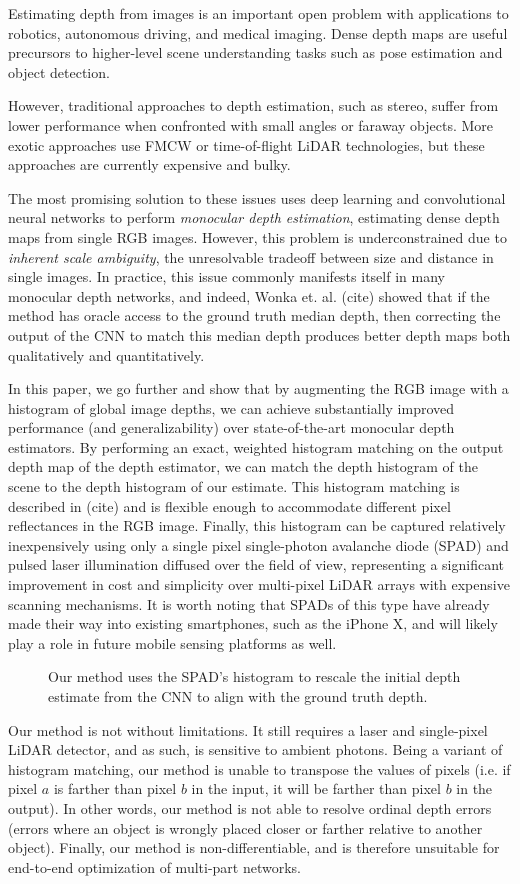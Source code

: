 Estimating depth from images is an important open problem with applications
to robotics, autonomous driving, and medical imaging. Dense depth maps are
useful precursors to higher-level scene understanding tasks such as pose
estimation and object detection.

However, traditional approaches to depth estimation, such as stereo, suffer from lower performance
when confronted with small angles or faraway objects.
More exotic approaches use FMCW or time-of-flight LiDAR technologies,
but these approaches are currently expensive and bulky. 

The most promising solution to these issues uses deep learning and 
convolutional neural networks to perform \textit{monocular depth estimation},
estimating dense depth maps from single RGB images. 
However, this problem is underconstrained due to \textit{inherent scale ambiguity}, the unresolvable
tradeoff between size and distance in single images. In practice, this issue commonly
manifests itself in many monocular depth networks, and indeed, 
Wonka et. al. (cite) showed that if the method has oracle access to the ground truth
median depth, then correcting the output of the CNN to match this median
depth produces better depth maps both qualitatively and quantitatively.

In this paper, we go further and show that by augmenting the RGB image with a histogram of
global image depths, we can achieve substantially improved performance
(and generalizability) over state-of-the-art monocular depth
estimators. By performing an exact, weighted histogram matching on the output
depth map of the depth estimator, we can match the depth histogram of the scene
to the depth histogram of our estimate. This histogram matching is described in
(cite) and is flexible enough to accommodate different pixel reflectances in the
RGB image. Finally, this histogram can be captured
relatively inexpensively using only a single pixel single-photon avalanche diode
(SPAD) and pulsed laser illumination diffused over the field of view, 
representing a significant improvement in cost and simplicity over multi-pixel LiDAR
arrays with expensive scanning mechanisms. It is
worth noting that SPADs of this type have already made their way into existing
smartphones, such as the iPhone X, and will likely play a role in future mobile sensing platforms as well.

\begin{figure}
  \caption{Our method uses the SPAD's histogram to rescale the initial depth
    estimate from the CNN to align with the ground truth depth.}
\end{figure}
Our method is not without limitations. It still requires a laser and
single-pixel LiDAR detector, and as such, is sensitive to ambient photons. Being 
a variant of histogram matching, our method is unable to transpose the
values of pixels (i.e. if pixel $a$ is farther
than pixel $b$ in the input, it will be farther than pixel $b$ in the output).
In other words, our method is not able to resolve ordinal depth errors
(errors where an object is wrongly placed closer or farther
relative to another object). Finally, our method is non-differentiable, and is
therefore unsuitable for end-to-end optimization of multi-part networks.

